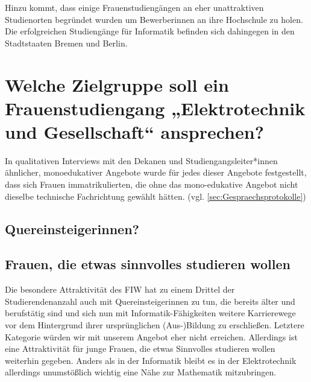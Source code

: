 \documentclass[a4paper, 12 pt]{IEEEtran}
\begin{document}
Hinzu kommt, dass einige Frauenstudiengängen an eher unattraktiven Studienorten begründet wurden um Bewerberinnen an ihre Hochschule zu holen. Die erfolgreichen Studiengänge für Informatik befinden sich dahingegen in den Stadtstaaten Bremen und Berlin.





\section{Welche Zielgruppe soll ein Frauenstudiengang „Elektrotechnik und Gesellschaft“ ansprechen?}
\label{sec:unsereZielgruppe}






In qualitativen Interviews mit den Dekanen und Studiengangsleiter*innen ähnlicher, monoedukativer Angebote wurde für jedes dieser Angebote festgestellt, dass sich Frauen immatrikulierten, die ohne das mono-edukative Angebot nicht dieselbe technische Fachrichtung gewählt hätten. (vgl. \ref{sec:Gespraechsprotokolle}) 


\subsection{Quereinsteigerinnen?}

\subsection{Frauen, die etwas sinnvolles studieren wollen}
Die besondere Attraktivität des FIW hat zu einem Drittel der Studierendenanzahl auch mit Quereinsteigerinnen zu tun, die bereits älter und berufstätig sind und sich nun mit Informatik-Fähigkeiten weitere Karrierewege vor dem Hintergrund ihrer ursprünglichen (Aus-)Bildung zu erschließen. Letztere Kategorie würden wir mit unserem Angebot eher nicht erreichen. Allerdings ist eine Attraktivität für junge Frauen, die etwas Sinnvolles studieren wollen weiterhin gegeben. Anders als in der Informatik bleibt es in der Elektrotechnik allerdings unumstößlich wichtig eine Nähe zur Mathematik mitzubringen.
\end{document}
